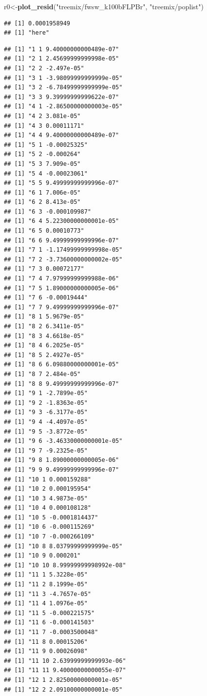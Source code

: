 \documentclass[]{article}
\newenvironment{Shaded}{\begin{snugshade}}{\end{snugshade}}
\newcommand{\KeywordTok}[1]{\textcolor[rgb]{0.13,0.29,0.53}{\textbf{#1}}}
\newcommand{\StringTok}[1]{\textcolor[rgb]{0.31,0.60,0.02}{#1}}
\newcommand{\NormalTok}[1]{#1}
\begin{document}
\begin{Shaded}
\begin{Highlighting}[]
\NormalTok{r0<-}\KeywordTok{plot_resid}\NormalTok{(}\StringTok{"treemix/fwsw_k100bFLPBr"}\NormalTok{,  }\StringTok{"treemix/poplist"}\NormalTok{)}
\end{Highlighting}
\end{Shaded}

\begin{verbatim}
## [1] 0.0001958949
## [1] "here"
\end{verbatim}

\begin{verbatim}
## [1] "1 1 9.40000000000489e-07"
## [1] "2 1 2.45699999999998e-05"
## [1] "2 2 -2.497e-05"
## [1] "3 1 -3.98099999999999e-05"
## [1] "3 2 -6.78499999999999e-05"
## [1] "3 3 9.39999999999622e-07"
## [1] "4 1 -2.86500000000003e-05"
## [1] "4 2 3.081e-05"
## [1] "4 3 0.00011171"
## [1] "4 4 9.40000000000489e-07"
## [1] "5 1 -0.00025325"
## [1] "5 2 -0.000264"
## [1] "5 3 7.909e-05"
## [1] "5 4 -0.00023061"
## [1] "5 5 9.49999999999996e-07"
## [1] "6 1 7.006e-05"
## [1] "6 2 8.413e-05"
## [1] "6 3 -0.000109987"
## [1] "6 4 5.22300000000001e-05"
## [1] "6 5 0.00010773"
## [1] "6 6 9.49999999999996e-07"
## [1] "7 1 -1.17499999999998e-05"
## [1] "7 2 -3.73600000000002e-05"
## [1] "7 3 0.00072177"
## [1] "7 4 7.97999999999988e-06"
## [1] "7 5 1.89000000000005e-06"
## [1] "7 6 -0.00019444"
## [1] "7 7 9.49999999999996e-07"
## [1] "8 1 5.9679e-05"
## [1] "8 2 6.3411e-05"
## [1] "8 3 4.6618e-05"
## [1] "8 4 6.2025e-05"
## [1] "8 5 2.4927e-05"
## [1] "8 6 6.09880000000001e-05"
## [1] "8 7 2.484e-05"
## [1] "8 8 9.49999999999996e-07"
## [1] "9 1 -2.7899e-05"
## [1] "9 2 -1.8363e-05"
## [1] "9 3 -6.3177e-05"
## [1] "9 4 -4.4097e-05"
## [1] "9 5 -3.8772e-05"
## [1] "9 6 -3.46330000000001e-05"
## [1] "9 7 -9.2325e-05"
## [1] "9 8 1.89000000000005e-06"
## [1] "9 9 9.49999999999996e-07"
## [1] "10 1 0.000159288"
## [1] "10 2 0.000195954"
## [1] "10 3 4.9873e-05"
## [1] "10 4 0.000108128"
## [1] "10 5 -0.0001814437"
## [1] "10 6 -0.000115269"
## [1] "10 7 -0.000266109"
## [1] "10 8 8.03799999999999e-05"
## [1] "10 9 0.000201"
## [1] "10 10 8.99999999998992e-08"
## [1] "11 1 5.3228e-05"
## [1] "11 2 8.1999e-05"
## [1] "11 3 -4.7657e-05"
## [1] "11 4 1.0976e-05"
## [1] "11 5 -0.000221575"
## [1] "11 6 -0.000141503"
## [1] "11 7 -0.0003500048"
## [1] "11 8 0.00015206"
## [1] "11 9 0.00026098"
## [1] "11 10 2.63999999999993e-06"
## [1] "11 11 9.40000000000055e-07"
## [1] "12 1 2.82500000000001e-05"
## [1] "12 2 2.09100000000001e-05"

\end{verbatim}
\end{document}
